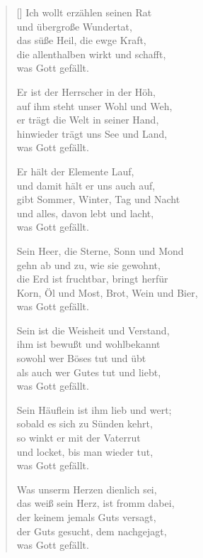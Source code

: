 \begin{multicols}{2}
\begin{verse}[\versewidth]
 Ich wollt erzählen seinen Rat\\
und übergroße Wundertat,\\
das süße Heil, die ewge Kraft,\\
die allenthalben wirkt und schafft,\\
was Gott gefällt.

 Er ist der Herrscher in der Höh,\\
auf ihm steht unser Wohl und Weh,\\
er trägt die Welt in seiner Hand,\\
hinwieder trägt uns See und Land,\\
was Gott gefällt.

 Er hält der Elemente Lauf,\\
und damit hält er uns auch auf,\\
gibt Sommer, Winter, Tag und Nacht\\
und alles, davon lebt und lacht,\\
was Gott gefällt.

 Sein Heer, die Sterne, Sonn und Mond\\
gehn ab und zu, wie sie gewohnt,\\
die Erd ist fruchtbar, bringt herfür\\
Korn, Öl und Most, Brot, Wein und Bier,\\
was Gott gefällt.

 Sein ist die Weisheit und Verstand,\\
ihm ist bewußt und wohlbekannt\\
sowohl wer Böses tut und übt\\
als auch wer Gutes tut und liebt,\\
was Gott gefällt.

 Sein Häuflein ist ihm lieb und wert;\\
sobald es sich zu Sünden kehrt,\\
so winkt er mit der Vaterrut\\
und locket, bis man wieder tut,\\
was Gott gefällt.

 Was unserm Herzen dienlich sei,\\
das weiß sein Herz, ist fromm dabei,\\
der keinem jemals Guts versagt,\\
der Guts gesucht, dem nachgejagt,\\
was Gott gefällt.


\end{verse}
\end{multicols}
